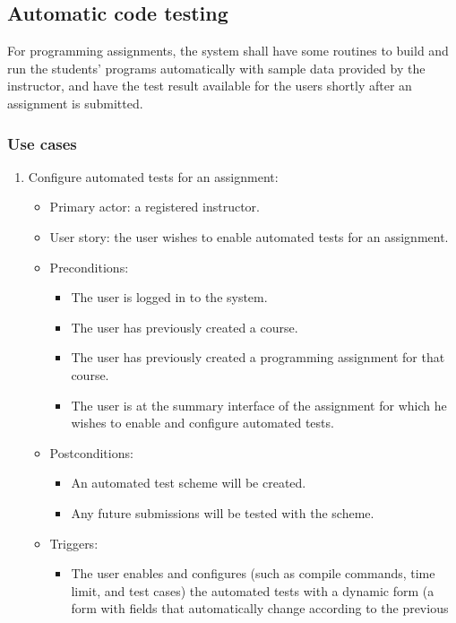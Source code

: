 \subsection{Automatic code testing}
For programming assignments, the system shall have some routines to build and
run the students' programs automatically with sample data provided by the
instructor, and have the test result available for the users shortly after an
assignment is submitted.

\subsubsection{Use cases}
\begin{enumerate}
\item Configure automated tests for an assignment:
\begin{itemize}
    \item Primary actor: a registered instructor.
    \item User story: the user wishes to enable automated tests for an
        assignment.
    \item Preconditions:
        \begin{itemize}
            \item The user is logged in to the system.
            \item The user has previously created a course.
            \item The user has previously created a programming assignment for
                that course.
            \item The user is at the summary interface of the assignment for
                which he wishes to enable and configure automated tests.
        \end{itemize}
    \item Postconditions:
        \begin{itemize}
            \item An automated test scheme will be created.
            \item Any future submissions will be tested with the scheme.
        \end{itemize}
    \item Triggers:
        \begin{itemize}
            \item The user enables and configures (such as compile commands, 
                time limit, and
                test cases) the automated tests with a dynamic form (a form
                with fields that automatically change according to the previous

\end{itemize}
\end{itemize}
\end{enumerate}

